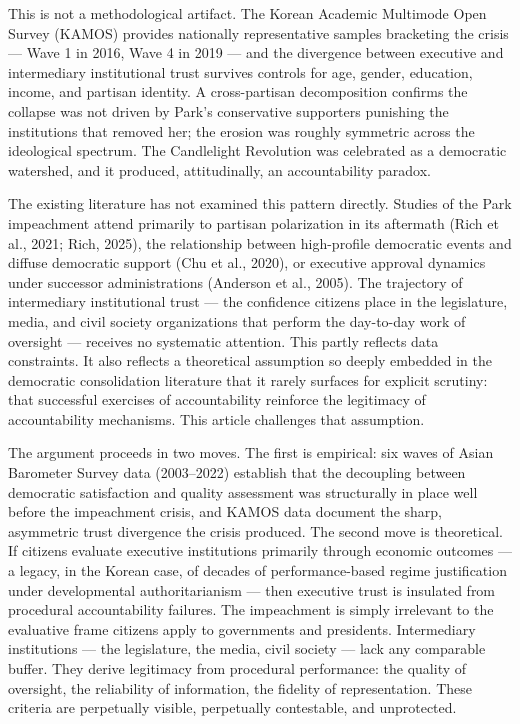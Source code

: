 \documentclass[
  12pt,
  letterpaper]{article}
\begin{document}
This is not a methodological artifact. The Korean Academic Multimode
Open Survey (KAMOS) provides nationally representative samples
bracketing the crisis --- Wave 1 in 2016, Wave 4 in 2019 --- and the
divergence between executive and intermediary institutional trust
survives controls for age, gender, education, income, and partisan
identity. A cross-partisan decomposition confirms the collapse was not
driven by Park's conservative supporters punishing the institutions that
removed her; the erosion was roughly symmetric across the ideological
spectrum. The Candlelight Revolution was celebrated as a democratic
watershed, and it produced, attitudinally, an accountability paradox.

The existing literature has not examined this pattern directly. Studies
of the Park impeachment attend primarily to partisan polarization in its
aftermath (Rich et al., 2021; Rich, 2025), the relationship between
high-profile democratic events and diffuse democratic support (Chu et
al., 2020), or executive approval dynamics under successor
administrations (Anderson et al., 2005). The trajectory of intermediary
institutional trust --- the confidence citizens place in the
legislature, media, and civil society organizations that perform the
day-to-day work of oversight --- receives no systematic attention. This
partly reflects data constraints. It also reflects a theoretical
assumption so deeply embedded in the democratic consolidation literature
that it rarely surfaces for explicit scrutiny: that successful exercises
of accountability reinforce the legitimacy of accountability mechanisms.
This article challenges that assumption.

The argument proceeds in two moves. The first is empirical: six waves of
Asian Barometer Survey data (2003--2022) establish that the decoupling
between democratic satisfaction and quality assessment was structurally
in place well before the impeachment crisis, and KAMOS data document the
sharp, asymmetric trust divergence the crisis produced. The second move
is theoretical. If citizens evaluate executive institutions primarily
through economic outcomes --- a legacy, in the Korean case, of decades
of performance-based regime justification under developmental
authoritarianism --- then executive trust is insulated from procedural
accountability failures. The impeachment is simply irrelevant to the
evaluative frame citizens apply to governments and presidents.
Intermediary institutions --- the legislature, the media, civil society
--- lack any comparable buffer. They derive legitimacy from procedural
performance: the quality of oversight, the reliability of information,
the fidelity of representation. These criteria are perpetually visible,
perpetually contestable, and unprotected.
\end{document}
